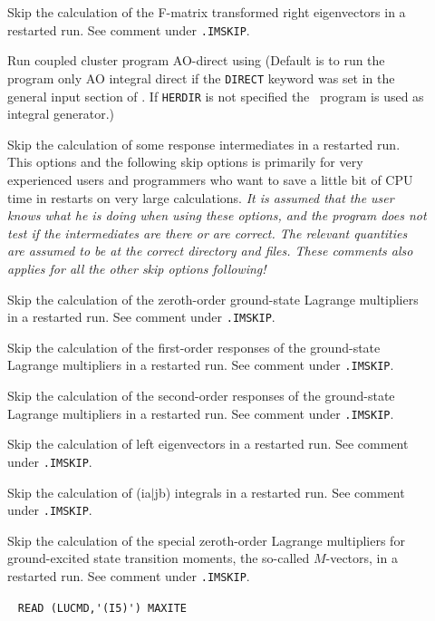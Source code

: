 \begin{description}
\item[] 
   Skip the calculation of the F-matrix transformed right eigenvectors
   in a restarted run. See comment under \verb|.IMSKIP|.
%
\item[] 
       Run coupled cluster program AO-direct
       using {\her}
       (Default is to run the program only AO integral direct
       if the \verb+DIRECT+ keyword was set in the general
       input section of \dalton . If \verb+HERDIR+ is not specified the \eri\
       program is used as integral generator.) 
%
\item[] 
   Skip the calculation of some response intermediates in a restarted run.
   This options and the following skip options is primarily for very experienced users 
   and programmers who want to save a little bit of CPU time in restarts on very large 
   calculations. 
   {\em It is assumed that the user knows what he is doing when using these options, and
   the program does not test if the intermediates are there or are correct. 
   The relevant quantities are assumed to be at the correct directory and files.
   These comments also applies for all the other skip options following! }
%
\item[]  
   Skip the calculation of the zeroth-order ground-state Lagrange
   multipliers in a restarted run. See comment under \verb|.IMSKIP|.
%
\item[] 
   Skip the calculation of the first-order responses of the 
   ground-state Lagrange multipliers in a restarted run. See comment under \verb|.IMSKIP|.
%
\item[]  
   Skip the calculation of the second-order responses of the 
   ground-state Lagrange multipliers in a restarted run. See comment under \verb|.IMSKIP|.
%
\item[]  
   Skip the calculation of left eigenvectors
   in a restarted run. See comment under \verb|.IMSKIP|.
%
\item[] 
   Skip the calculation of (ia$\mid$jb) integrals in a restarted run. See comment under \verb|.IMSKIP|.
%
\item[] 
   Skip the calculation of the special zeroth-order Lagrange 
   multipliers for ground-excited state transition moments,
   the so-called $M$-vectors, in a restarted run. See comment under \verb|.IMSKIP|.
%
\item[] \verb| |\newline
  \verb|READ (LUCMD,'(I5)') MAXITE|


\end{description}
